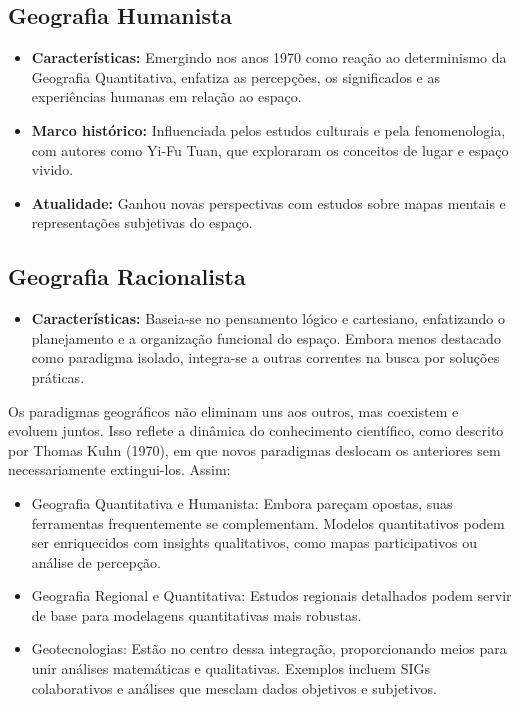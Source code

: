 \documentclass[
]{article}
\begin{document}
\subsection{Geografia Humanista}

\begin{itemize}
  \item \textbf{Características:} Emergindo nos anos 1970 como reação ao determinismo da Geografia Quantitativa, enfatiza as percepções, os significados e as experiências humanas em relação ao espaço.
  \item \textbf{Marco histórico:} Influenciada pelos estudos culturais e pela fenomenologia, com autores como Yi-Fu Tuan, que exploraram os conceitos de lugar e espaço vivido.
  \item \textbf{Atualidade:} Ganhou novas perspectivas com estudos sobre mapas mentais e representações subjetivas do espaço.
\end{itemize}

\subsection{Geografia Racionalista}

\begin{itemize}
  \item \textbf{Características:} Baseia-se no pensamento lógico e cartesiano, enfatizando o planejamento e a organização funcional do espaço. Embora menos destacado como paradigma isolado, integra-se a outras correntes na busca por soluções práticas.
\end{itemize}

Os paradigmas geográficos não eliminam uns aos outros, mas coexistem e evoluem juntos. Isso reflete a dinâmica do conhecimento científico, como descrito por Thomas Kuhn (1970), em que novos paradigmas deslocam os anteriores sem necessariamente extingui-los. Assim:

\begin{itemize}
  \item Geografia Quantitativa e Humanista: Embora pareçam opostas, suas ferramentas frequentemente se complementam. Modelos quantitativos podem ser enriquecidos com insights qualitativos, como mapas participativos ou análise de percepção.
  \item Geografia Regional e Quantitativa: Estudos regionais detalhados podem servir de base para modelagens quantitativas mais robustas.
  \item Geotecnologias: Estão no centro dessa integração, proporcionando meios para unir análises matemáticas e qualitativas. Exemplos incluem SIGs colaborativos e análises que mesclam dados objetivos e subjetivos.
\end{itemize}
\end{document}

